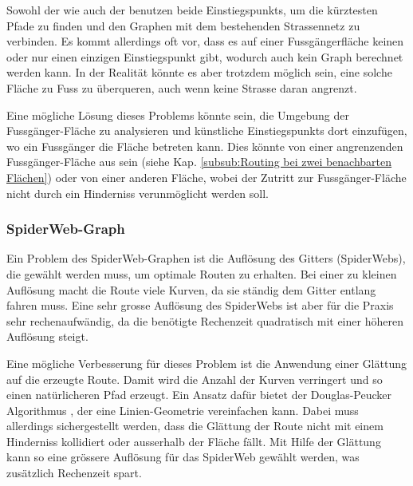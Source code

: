 Sowohl der  wie auch der  benutzen beide \glspl{Einstiegspunkt}, um die kürztesten Pfade zu finden und den Graphen mit dem bestehenden Strassennetz zu verbinden. Es kommt allerdings oft vor, dass es auf einer Fussgängerfläche keinen oder nur einen einzigen Einstiegspunkt gibt, wodurch auch kein Graph berechnet werden kann. In der Realität könnte es aber trotzdem möglich sein, eine solche Fläche zu Fuss zu überqueren, auch wenn keine Strasse daran angrenzt.

Eine mögliche Lösung dieses Problems könnte sein, die Umgebung der Fussgänger-Fläche zu analysieren und künstliche \glspl{Einstiegspunkt} dort einzufügen, wo ein Fussgänger die Fläche betreten kann. Dies könnte von einer angrenzenden Fussgänger-Fläche aus sein (siehe Kap. \ref{subsub:Routing bei zwei benachbarten Flächen}) oder von einer anderen Fläche, wobei der Zutritt zur Fussgänger-Fläche nicht durch ein Hinderniss verunmöglicht werden soll.

\subsubsection{SpiderWeb-Graph}
\label{subsub:Verbesserung_SpiderWeb}

Ein Problem des SpiderWeb-Graphen ist die Auflösung des Gitters (SpiderWebs), die gewählt werden muss, um optimale Routen zu erhalten. Bei einer zu kleinen Auflösung macht die Route viele Kurven, da sie ständig dem Gitter entlang fahren muss. Eine sehr grosse Auflösung des SpiderWebs ist aber für die Praxis sehr rechenaufwändig, da die benötigte Rechenzeit quadratisch mit einer höheren Auflösung steigt.

Eine mögliche Verbesserung für dieses Problem ist die Anwendung einer Glättung auf die erzeugte Route. Damit wird die Anzahl der Kurven verringert und so einen natürlicheren Pfad erzeugt. Ein Ansatz dafür bietet der Douglas-Peucker Algorithmus \cite{douglas-peucker_algorithm}, der eine Linien-Geometrie vereinfachen kann. Dabei muss allerdings sichergestellt werden, dass die Glättung der Route nicht mit einem Hinderniss kollidiert oder ausserhalb der Fläche fällt. Mit Hilfe der Glättung kann so eine grössere Auflösung für das SpiderWeb gewählt werden, was zusätzlich Rechenzeit spart.